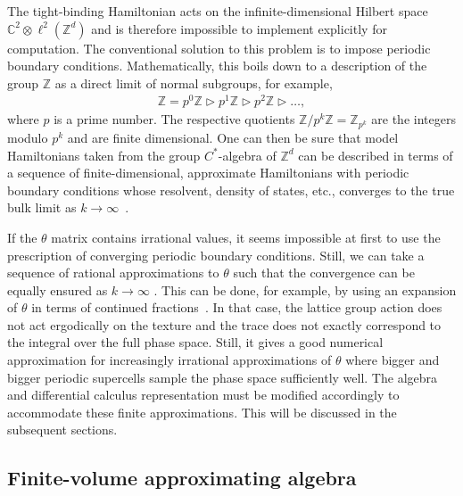 \documentclass[submission, Phys]{SciPost}
\begin{document}
The tight-binding Hamiltonian acts on the infinite-dimensional Hilbert space $\mathbb{C}^2\otimes \ell^2(\mathbb{Z}^d)$ and is therefore impossible to implement explicitly for computation. 
The conventional solution to this problem is to impose periodic boundary conditions.
Mathematically, this boils down to a description of the group $\mathbb{Z}$ as a direct limit of normal subgroups, for example,
\begin{align}
    \mathbb{Z} = p^0 \mathbb{Z} \triangleright p^1 \mathbb{Z} \triangleright p^2 \mathbb{Z} \triangleright  \ldots,
\end{align}
where $p$ is a prime number. The respective quotients $\mathbb{Z} / p^k \mathbb{Z} = \mathbb{Z}_{p^k}$ are the integers modulo $p^k$ and are finite dimensional.
One can then be sure that model Hamiltonians taken from the group $C^\ast$-algebra of $\mathbb{Z}^d$ can be described in terms of a sequence of finite-dimensional, approximate Hamiltonians with periodic boundary conditions whose resolvent, density of states, etc., converges to the true bulk limit as $k\to \infty$~\cite{Lux2023}. 

If the $\theta$ matrix contains irrational values, it seems impossible at first to use the prescription of converging periodic boundary conditions.
Still, we can take a sequence of rational approximations to $\theta$ such that the convergence can be equally ensured as $k\to\infty$ \cite[Ch. 5]{Prodan2017}. 
This can be done, for example, by using an expansion of $\theta$ in terms of continued fractions~\cite{Landi2001}.
In that case, the lattice group action does not act ergodically on the texture and the trace does not exactly correspond to the integral over the full phase space. 
Still, it gives a good numerical approximation for increasingly irrational approximations of $\theta$ where bigger and bigger periodic supercells sample the phase space sufficiently well. 
The algebra and differential calculus representation must be modified accordingly to accommodate these finite approximations. 
This will be discussed in the subsequent sections.


\subsection{Finite-volume approximating algebra}
\label{subsec:periodic_boundary}
\end{document}
